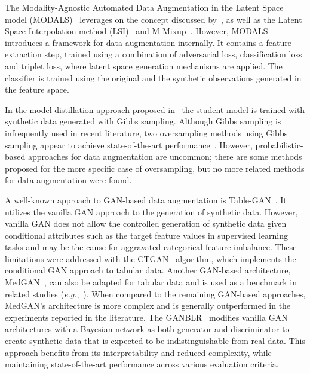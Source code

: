 \documentclass[parskip=full]{scrartcl}
\begin{document}
The Modality-Agnostic Automated Data Augmentation in the Latent Space model
(MODALS)~\cite{cheung2020modals} leverages on the concept discussed
by~\citet{devries2017dataset}, as well as the Latent Space Interpolation
method (LSI)~\cite{liu2018data} and M-Mixup~\cite{verma2019manifold}.
However, MODALS introduces a framework for data augmentation internally. It
contains a feature extraction step, trained using a combination of adversarial
loss, classification loss and triplet loss, where latent space generation
mechanisms are applied. The classifier is trained using the original and the
synthetic observations generated in the feature space.

In the model distillation approach proposed in~\cite{fakoor2020fast} the
student model is trained with synthetic data generated with Gibbs sampling.
Although Gibbs sampling is infrequently used in recent literature, two
oversampling methods using Gibbs sampling appear to achieve state-of-the-art
performance~\cite{das2014racog}. However, probabilistic-based approaches for
data augmentation are uncommon; there are some methods proposed for the more
specific case of oversampling, but no more related methods for data
augmentation were found.

A well-known approach to GAN-based data augmentation is
Table-GAN~\cite{park2018data}. It utilizes the vanilla GAN approach to the
generation of synthetic data. However, vanilla GAN does not allow the
controlled generation of synthetic data given conditional attributes such as
the target feature values in supervised learning tasks and may be the cause
for aggravated categorical feature imbalance. These limitations were addressed
with the CTGAN~\cite{xu2019modeling} algorithm, which implements the
conditional GAN approach to tabular data. Another GAN-based architecture,
MedGAN~\cite{armanious2020medgan}, can also be adapted for tabular data and is
used as a benchmark in related studies (\textit{e.g.},~\cite{xu2019modeling,
zhang2021ganblr}). When compared to the remaining GAN-based approaches,
MedGAN's architecture is more complex and is generally outperformed in the
experiments reported in the literature. The GANBLR~\cite{zhang2021ganblr}
modifies vanilla GAN architectures with a Bayesian network as both generator
and discriminator to create synthetic data that is expected to be
indistinguishable from real data. This approach benefits from its
interpretability and reduced complexity, while maintaining state-of-the-art
performance across various evaluation criteria.
\end{document}
